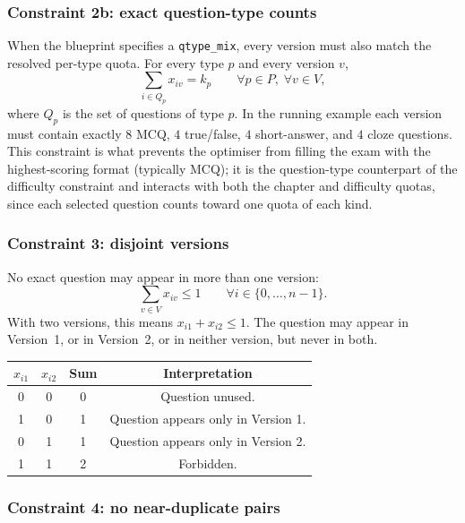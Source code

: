 \documentclass[11pt,a4paper]{article}
\newcommand{\code}[1]{\texttt{\small #1}}
\begin{document}
\subsubsection{Constraint 2b: exact question-type counts}

When the blueprint specifies a \code{qtype\_mix}, every version must also match
the resolved per-type quota. For every type $p$ and every version $v$,
\begin{equation}
  \sum_{i\in Q_p} x_{iv}=k_p
  \qquad \forall p\in P,\;\forall v\in V,
  \label{eq:deep-qtype}
\end{equation}
where $Q_p$ is the set of questions of type $p$. In the running example each
version must contain exactly $8$ MCQ, $4$ true/false, $4$ short-answer, and $4$
cloze questions. This constraint is what prevents the optimiser from filling the
exam with the highest-scoring format (typically MCQ); it is the question-type
counterpart of the difficulty constraint and interacts with both the chapter
and difficulty quotas, since each selected question counts toward one quota of
each kind.

\subsubsection{Constraint 3: disjoint versions}

No exact question may appear in more than one version:
\begin{equation}
  \sum_{v\in V}x_{iv}\leq 1
  \qquad \forall i\in\{0,\ldots,n-1\}.
  \label{eq:deep-disjoint}
\end{equation}
With two versions, this means $x_{i1}+x_{i2}\leq 1$. The question may appear in
Version~1, or in Version~2, or in neither version, but never in both.

\begin{center}
\begin{tabular}{@{}cccc@{}}
\toprule
$x_{i1}$ & $x_{i2}$ & Sum & Interpretation \\
\midrule
0 & 0 & 0 & Question unused. \\
1 & 0 & 1 & Question appears only in Version 1. \\
0 & 1 & 1 & Question appears only in Version 2. \\
1 & 1 & 2 & Forbidden. \\
\bottomrule
\end{tabular}
\end{center}

\subsubsection{Constraint 4: no near-duplicate pairs}
\end{document}
